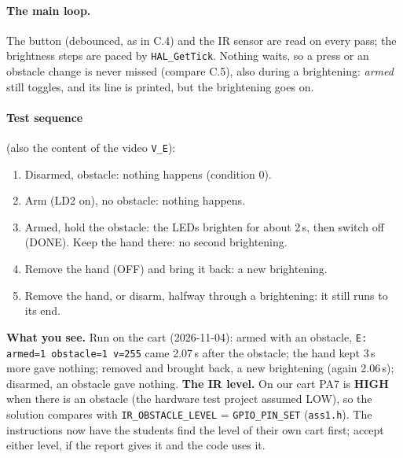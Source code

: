 \documentclass[11pt,a4paper]{article}
\newcommand{\see}[1]{\textbf{What you see.} #1}
\begin{document}
\paragraph{The main loop.} The button (debounced, as in C.4) and the IR sensor are read on every pass; the brightness
steps are paced by \texttt{HAL\_GetTick}. Nothing waits, so a press or an obstacle change is never missed (compare C.5),
also during a brightening: \emph{armed} still toggles, and its line is printed, but the brightening goes on.

\paragraph{Test sequence} (also the content of the video \texttt{V\_E}):
\begin{enumerate}
  \item Disarmed, obstacle: nothing happens (condition 0).
  \item Arm (LD2 on), no obstacle: nothing happens.
  \item Armed, hold the obstacle: the LEDs brighten for about 2\,s, then switch off (DONE). Keep the hand there: no
        second brightening.
  \item Remove the hand (OFF) and bring it back: a new brightening.
  \item Remove the hand, or disarm, halfway through a brightening: it still runs to its end.
\end{enumerate}
\see{Run on the cart (2026-11-04): armed with an obstacle, \texttt{E: armed=1 obstacle=1 v=255} came 2.07\,s after the
obstacle; the hand kept 3\,s more gave nothing; removed and brought back, a new brightening (again 2.06\,s); disarmed, an
obstacle gave nothing.}
\textbf{The IR level.} On our cart PA7 is \textbf{HIGH} when there is an obstacle (the hardware test project assumed
LOW), so the solution compares with \texttt{IR\_OBSTACLE\_LEVEL} = \texttt{GPIO\_PIN\_SET} (\texttt{ass1.h}). The
instructions now have the students find the level of their own cart first; accept either level, if the report gives it
and the code uses it.
\end{document}
